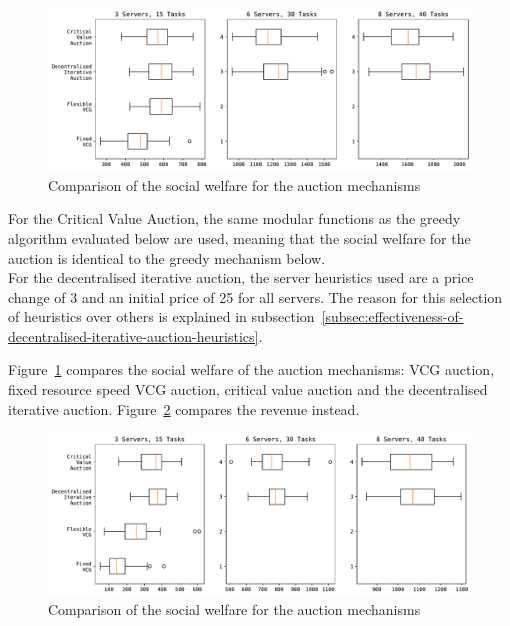\begin{figure}[h]
    \centering
    \includegraphics[width=\linewidth]{figs/auctions/multi_setting_social_welfare.pdf}
    \caption{Comparison of the social welfare for the auction mechanisms}
    \label{fig:auction-mechanisms-social-welfare}
\end{figure}

For the Critical Value Auction, the same modular functions as the greedy algorithm evaluated below are used, meaning
that the social welfare for the auction is identical to the greedy mechanism below. \\
For the decentralised iterative auction, the server heuristics used are a price change of 3 and an initial price of 25
for all servers. The reason for this selection of heuristics over others is explained in
subsection~\ref{subsec:effectiveness-of-decentralised-iterative-auction-heuristics}.

Figure~\ref{fig:auction-mechanisms-social-welfare} compares the social welfare of the auction mechanisms: VCG auction,
fixed resource speed VCG auction, critical value auction and the decentralised iterative auction.
Figure~\ref{fig:auction-mechanisms-revenue} compares the revenue instead.

\begin{figure}[h]
    \centering
    \includegraphics[width=\linewidth]{figs/auctions/multi_setting_revenue.pdf}
    \caption{Comparison of the social welfare for the auction mechanisms}
    \label{fig:auction-mechanisms-revenue}
\end{figure}

